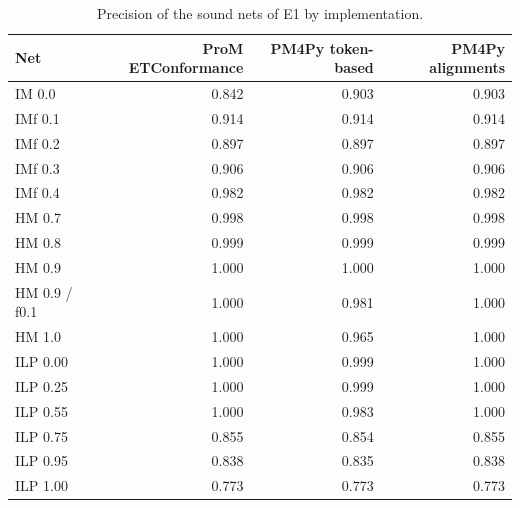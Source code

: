 \begin{table}[htbp]
\centering
\small
\begin{tabular}{lrrr}
\toprule
\textbf{Net} & \textbf{ProM ETConformance} & \textbf{PM4Py token-based} & \textbf{PM4Py alignments} \\
\midrule
IM 0.0 & 0.842 & 0.903 & 0.903 \\
IMf 0.1 & 0.914 & 0.914 & 0.914 \\
IMf 0.2 & 0.897 & 0.897 & 0.897 \\
IMf 0.3 & 0.906 & 0.906 & 0.906 \\
IMf 0.4 & 0.982 & 0.982 & 0.982 \\
HM 0.7 & 0.998 & 0.998 & 0.998 \\
HM 0.8 & 0.999 & 0.999 & 0.999 \\
HM 0.9 & 1.000 & 1.000 & 1.000 \\
HM 0.9 / f0.1 & 1.000 & 0.981 & 1.000 \\
HM 1.0 & 1.000 & 0.965 & 1.000 \\
ILP 0.00 & 1.000 & 0.999 & 1.000 \\
ILP 0.25 & 1.000 & 0.999 & 1.000 \\
ILP 0.55 & 1.000 & 0.983 & 1.000 \\
ILP 0.75 & 0.855 & 0.854 & 0.855 \\
ILP 0.95 & 0.838 & 0.835 & 0.838 \\
ILP 1.00 & 0.773 & 0.773 & 0.773 \\
\bottomrule
\end{tabular}
\par{}
\caption{Precision of the sound nets of E1 by implementation.}
\label{tab:app_precision_tools}
\end{table}
